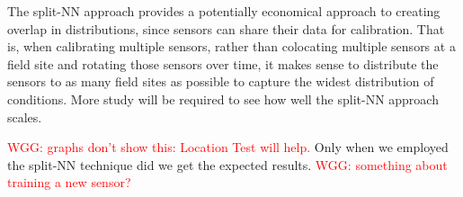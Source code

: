 \documentclass[journal abbreviation, manuscript]{copernicus}
\newcommand\todo[1]{\textcolor{red}{#1}}
\begin{document}
The split-NN approach provides a potentially economical approach to creating overlap in distributions, since sensors can share their data for calibration.  That is, when calibrating multiple sensors, rather than colocating multiple sensors at a field site and rotating those sensors over time, it makes sense to distribute the sensors to as many field sites as possible to capture the widest distribution of conditions.  More study will be required to see how well the split-NN approach scales.

\todo{WGG: graphs don't show this: Location Test will help.} Only when we employed the split-NN technique did we get the expected results.  
\todo{WGG: something about training a new sensor?}

% 



%
\end{document}
